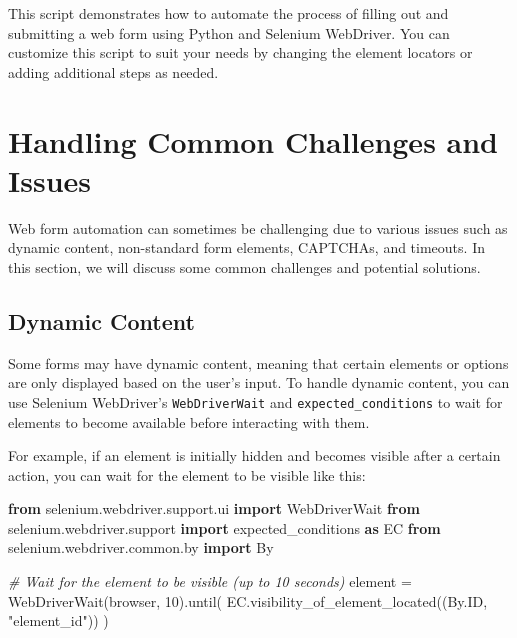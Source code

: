 \documentclass[
  paper=a4,
  ,captions=tableheading
]{scrartcl}
\newenvironment{Shaded}{}{}
\newcommand{\CommentTok}[1]{\textcolor[rgb]{0.38,0.63,0.69}{\textit{#1}}}
\newcommand{\DecValTok}[1]{\textcolor[rgb]{0.25,0.63,0.44}{#1}}
\newcommand{\ImportTok}[1]{\textcolor[rgb]{0.00,0.50,0.00}{\textbf{#1}}}
\newcommand{\NormalTok}[1]{#1}
\newcommand{\OperatorTok}[1]{\textcolor[rgb]{0.40,0.40,0.40}{#1}}
\newcommand{\StringTok}[1]{\textcolor[rgb]{0.25,0.44,0.63}{#1}}
\begin{document}
This script demonstrates how to automate the process of filling out and
submitting a web form using Python and Selenium WebDriver. You can
customize this script to suit your needs by changing the element
locators or adding additional steps as needed.

\hypertarget{handling-common-challenges-and-issues}{%
\section{Handling Common Challenges and
Issues}\label{handling-common-challenges-and-issues}}

Web form automation can sometimes be challenging due to various issues
such as dynamic content, non-standard form elements, CAPTCHAs, and
timeouts. In this section, we will discuss some common challenges and
potential solutions.

\hypertarget{dynamic-content}{%
\subsection{Dynamic Content}\label{dynamic-content}}

Some forms may have dynamic content, meaning that certain elements or
options are only displayed based on the user's input. To handle dynamic
content, you can use Selenium WebDriver's \texttt{WebDriverWait} and
\texttt{expected\_conditions} to wait for elements to become available
before interacting with them.

For example, if an element is initially hidden and becomes visible after
a certain action, you can wait for the element to be visible like this:

\begin{Shaded}
\begin{Highlighting}[]
\ImportTok{from}\NormalTok{ selenium.webdriver.support.ui }\ImportTok{import}\NormalTok{ WebDriverWait}
\ImportTok{from}\NormalTok{ selenium.webdriver.support }\ImportTok{import}\NormalTok{ expected\_conditions }\ImportTok{as}\NormalTok{ EC}
\ImportTok{from}\NormalTok{ selenium.webdriver.common.by }\ImportTok{import}\NormalTok{ By}

\CommentTok{\# Wait for the element to be visible (up to 10 seconds)}
\NormalTok{element }\OperatorTok{=}\NormalTok{ WebDriverWait(browser, }\DecValTok{10}\NormalTok{).until(}
\NormalTok{    EC.visibility\_of\_element\_located((By.ID, }\StringTok{"element\_id"}\NormalTok{))}
\NormalTok{)}
\end{Highlighting}
\end{Shaded}
\end{document}
